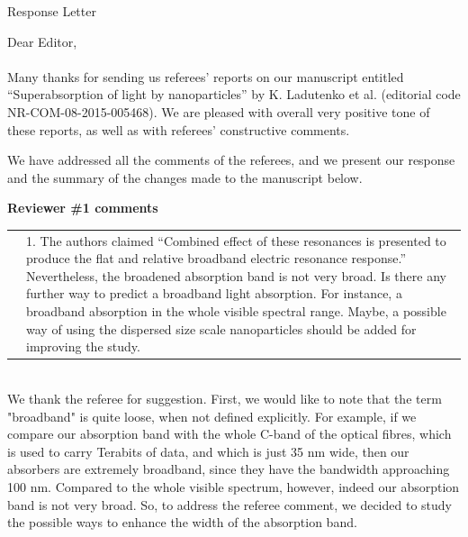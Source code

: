 \documentclass[a4paper]{article}
\begin{document}
\begin{center}
  Response Letter
\end{center}
Dear Editor,
\\
\\
Many thanks for sending us referees’ reports on our manuscript entitled “Superabsorption of light by nanoparticles” by K. Ladutenko et al. (editorial code NR-COM-08-2015-005468). We are pleased with overall very positive tone of these reports, as well as with referees’ constructive comments. 

We have addressed all the comments of the referees, and we present our response and the summary of the changes made to the manuscript below.

\vspace{10pt}

\newpage
\textbf{Reviewer \#1 comments}

\begin{tabular}[!H]{l|p{}}
\quad & 1. The authors claimed “Combined effect of these resonances is presented to produce the flat and relative broadband electric resonance response.” Nevertheless, the broadened absorption band is not very broad. Is there any further way to predict a broadband light absorption. For instance, a broadband absorption in the whole visible spectral range. Maybe, a possible way of using the dispersed size scale nanoparticles should be added for improving the study. 
\end{tabular}\\

We thank the referee for suggestion. First, we would like to note that the term "broadband" is quite loose, when not defined explicitly. For example, if we compare our absorption band with the whole C-band of the optical fibres, which is used to carry Terabits of data, and which is just 35 nm wide, then our absorbers are extremely broadband, since they have the bandwidth approaching 100 nm. Compared to the whole visible spectrum, however, indeed our absorption band is not very broad. So, to address the referee comment, we decided to study the possible ways to enhance the width of the absorption band. 
\end{document}
